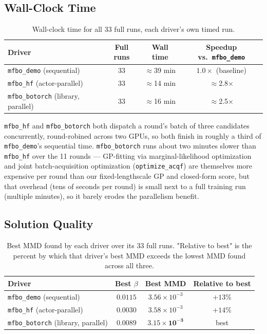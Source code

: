 \documentclass[11pt]{article}
\begin{document}
\subsection{Wall-Clock Time}
\label{sec:parallelism-result}

\begin{table}[htbp]
\centering
\begin{tabular}{lccc}
\hline
\textbf{Driver} & \textbf{Full runs} & \textbf{Wall time} & \textbf{Speedup vs.\ \texttt{mfbo\_demo}} \\
\hline
\texttt{mfbo\_demo} (sequential) & 33 & $\approx$39 min & $1.0\times$ (baseline) \\
\texttt{mfbo\_hf} (actor-parallel) & 33 & $\approx$14 min & $\approx$2.8$\times$ \\
\texttt{mfbo\_botorch} (library, parallel) & 33 & $\approx$16 min & $\approx$2.5$\times$ \\
\hline
\end{tabular}
\caption{Wall-clock time for all 33 full runs, each driver's own timed
run.}
\label{tab:wallclock}
\end{table}

\texttt{mfbo\_hf} and \texttt{mfbo\_botorch} both dispatch a round's
batch of three candidates concurrently, round-robined across two GPUs, so
both finish in roughly a third of \texttt{mfbo\_demo}'s sequential time.
\texttt{mfbo\_botorch} runs about two minutes slower than \texttt{mfbo\_hf}
over the 11 rounds — GP-fitting via marginal-likelihood optimization and
joint batch-acquisition optimization (\texttt{optimize\_acqf}) are
themselves more expensive per round than our fixed-lengthscale GP and
closed-form score, but that overhead (tens of seconds per round) is small
next to a full training run (multiple minutes), so it barely erodes the
parallelism benefit.

\subsection{Solution Quality}
\label{sec:library-result}

\begin{table}[htbp]
\centering
\begin{tabular}{lccc}
\hline
\textbf{Driver} & \textbf{Best $\beta$} & \textbf{Best MMD} & \textbf{Relative to best} \\
\hline
\texttt{mfbo\_demo} (sequential) & $0.0115$ & $3.56\times 10^{-3}$ & $+13\%$ \\
\texttt{mfbo\_hf} (actor-parallel) & $0.0030$ & $3.58\times 10^{-3}$ & $+14\%$ \\
\texttt{mfbo\_botorch} (library, parallel) & $0.0089$ & $\mathbf{3.15\times 10^{-3}}$ & best \\
\hline
\end{tabular}
\caption{Best MMD found by each driver over its 33 full runs. "Relative
to best" is the percent by which that driver's best MMD exceeds the
lowest MMD found across all three.}
\label{tab:quality}
\end{table}
\end{document}
